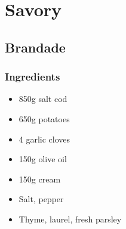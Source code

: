 \documentclass[10pt]{book}
\begin{document}

\newpage
\chapter*{Savory}


\newpage
\section*{Brandade}
\subsection*{Ingredients}
	\begin{itemize}
		\item 850g salt cod
		\item 650g potatoes
		\item 4 garlic cloves
		\item 150g olive oil
		\item 150g cream
		\item Salt, pepper
		\item Thyme, laurel, fresh parsley
	\end{itemize}
\end{document}
